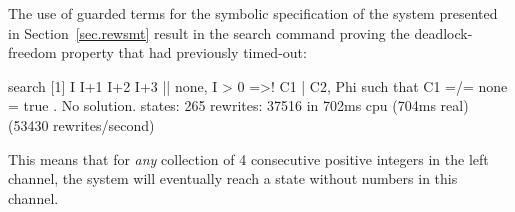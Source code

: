 The use of guarded terms for the symbolic specification of the system
presented in Section~\ref{sec.rewsmt} result in the search command
proving the deadlock-freedom property that had previously timed-out:
{\small
\begin{maude}
search [1]  { I  I+1 I+2 I+3 || none, I > 0 } 
       =>!  { C1 | C2, Phi } such that C1 =/= none = true .
No solution.
states: 265  rewrites: 37516 in 702ms cpu (704ms real) (53430 rewrites/second)
\end{maude}}

\noindent This means that for \emph{any} collection of 4 consecutive
positive integers in the left channel, the system will eventually
reach a state without numbers in this channel.
